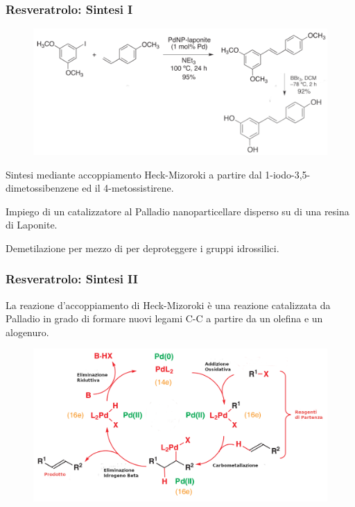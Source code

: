 \documentclass[9pt]{beamer}
\begin{document}
\begin{frame}
	\frametitle{Resveratrolo: Sintesi I}
	\begin{figure}
		\includegraphics{immagini/totale_resveratrolo.png}
	\end{figure}
	Sintesi mediante accoppiamento Heck-Mizoroki a partire dal 1-iodo-3,5-dimetossibenzene ed il 4-metossistirene.

	Impiego di un catalizzatore al Palladio nanoparticellare disperso su di una resina di Laponite.

	Demetilazione per mezzo di  per deproteggere i gruppi idrossilici.

\end{frame}

\begin{frame}
	\frametitle{Resveratrolo: Sintesi II}
	\bigskip
	La reazione d'accoppiamento di Heck-Mizoroki è una reazione catalizzata da Palladio in grado di formare nuovi legami C-C a partire da un olefina e un alogenuro.

	\begin{figure}
		\centering
		\includegraphics[width=\textwidth]{immagini/heck.png}
	\end{figure}
\end{frame}
\end{document}
